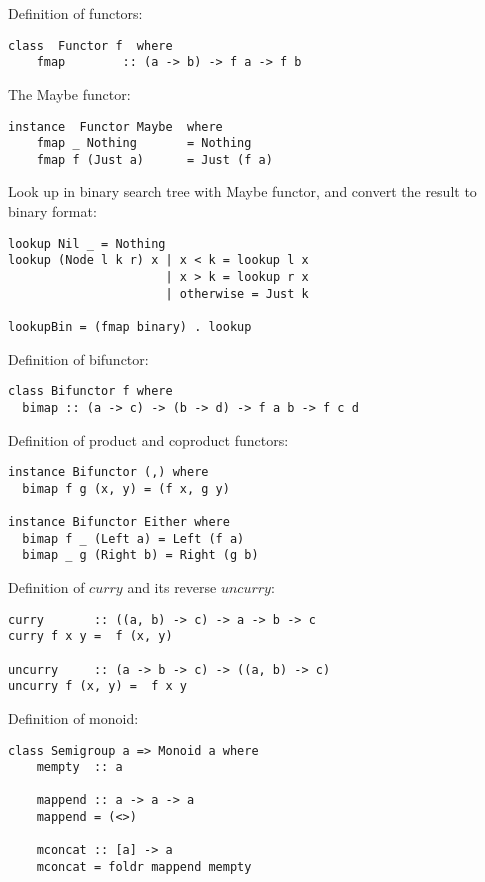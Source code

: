 \documentclass{article}
\begin{document}
Definition of functors:

\lstset{frame=single}
\begin{lstlisting}[style=Haskell]
class  Functor f  where
    fmap        :: (a -> b) -> f a -> f b
\end{lstlisting}

The Maybe functor:

\begin{lstlisting}
instance  Functor Maybe  where
    fmap _ Nothing       = Nothing
    fmap f (Just a)      = Just (f a)
\end{lstlisting}

Look up in binary search tree with Maybe functor, and convert the result to binary format:

\begin{lstlisting}[style=Haskell]
lookup Nil _ = Nothing
lookup (Node l k r) x | x < k = lookup l x
                      | x > k = lookup r x
                      | otherwise = Just k

lookupBin = (fmap binary) . lookup
\end{lstlisting}

Definition of bifunctor:

\begin{lstlisting}
class Bifunctor f where
  bimap :: (a -> c) -> (b -> d) -> f a b -> f c d
\end{lstlisting}

Definition of product and coproduct functors:

\begin{lstlisting}
instance Bifunctor (,) where
  bimap f g (x, y) = (f x, g y)

instance Bifunctor Either where
  bimap f _ (Left a) = Left (f a)
  bimap _ g (Right b) = Right (g b)
\end{lstlisting}

Definition of $curry$ and its reverse $uncurry$:

\begin{lstlisting}
curry       :: ((a, b) -> c) -> a -> b -> c
curry f x y =  f (x, y)

uncurry     :: (a -> b -> c) -> ((a, b) -> c)
uncurry f (x, y) =  f x y
\end{lstlisting}

Definition of monoid:

\begin{lstlisting}
class Semigroup a => Monoid a where
    mempty  :: a

    mappend :: a -> a -> a
    mappend = (<>)

    mconcat :: [a] -> a
    mconcat = foldr mappend mempty
\end{lstlisting}
\end{document}
